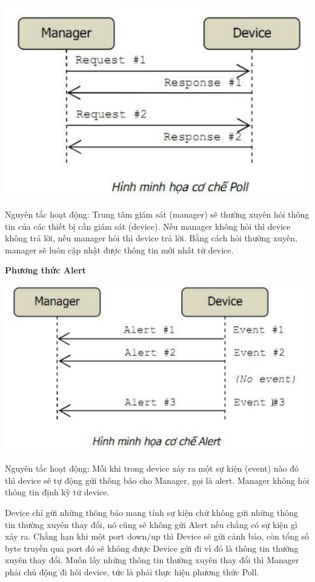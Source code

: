 \documentclass[12pt,oneside,a4paper,reqno]{report}
\begin{document}
\begin{large}
\begin{center}
	\includegraphics[scale=0.5]{images/poll.jpg}
\end{center}

Nguyên tắc hoạt động: Trung tâm giám sát (manager) sẽ thường xuyên hỏi thông tin của các thiết bị cần giám sát (device). Nếu manager không hỏi thì device không trả lời, nếu manager hỏi thì device trả lời. Bằng cách hỏi thường xuyên, manager sẽ luôn cập nhật được thông tin mới nhất từ device.

\textbf{Phương thức Alert}
\begin{center}
	\includegraphics[scale=0.5]{images/alert.jpg}
\end{center}
Nguyên tắc hoạt động: Mỗi khi trong device xảy ra một sự kiện (event) nào đó thì device sẽ tự động gửi thông báo cho Manager, gọi là alert. Manager không hỏi thông tin định kỳ từ device.

Device chỉ gửi những thông báo mang tính sự kiện chứ không gửi những thông tin thường xuyên thay đổi, nó cũng sẽ không gửi Alert nếu chẳng có sự kiện gì xảy ra. Chẳng hạn khi một port down/up thì Device sẽ gửi cảnh báo, còn tổng số byte truyền qua port đó sẽ không được Device gửi đi vì đó là thông tin thường xuyên thay đổi. Muốn lấy những thông tin thường xuyên thay đổi thì Manager phải chủ động đi hỏi device, tức là phải thực hiện phương thức Poll.


\end{large}
\end{document}

